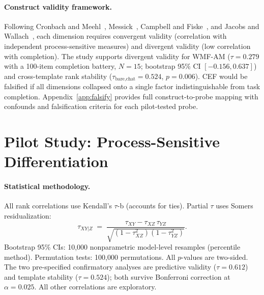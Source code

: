 \documentclass{article}
\begin{document}
\paragraph{Construct validity framework.}
Following Cronbach and Meehl~\citep{cronbach1955construct},
Messick~\citep{messick1989validity}, Campbell and
Fiske~\citep{campbell1959convergent}, and Jacobs and
Wallach~\citep{jacobs2021measurement}, each dimension requires convergent
validity (correlation with independent process-sensitive measures) and
divergent validity (low correlation with completion). The study supports
divergent validity for WMF-AM ($\tau = 0.279$ with a 100-item
completion battery, $N{=}15$; bootstrap 95\% CI $[-0.156, 0.637]$)
and cross-template rank stability ($\tau_{\text{bare,chat}} = 0.524$,
$p = 0.006$). CEF would
be falsified if all dimensions collapsed onto a single factor
indistinguishable from task completion.
Appendix~\ref{app:falsify} provides full construct-to-probe mapping
with confounds and falsification criteria for each pilot-tested probe.

\section{Pilot Study: Process-Sensitive Differentiation}
\label{sec:pilot}

\paragraph{Statistical methodology.}
All rank correlations use Kendall's $\tau$-b (accounts for ties).
Partial $\tau$ uses Somers residualization:
\[
  \tau_{XY|Z} \;=\; \frac{\tau_{XY} - \tau_{XZ}\,\tau_{YZ}}
  {\sqrt{(1-\tau_{XZ}^2)(1-\tau_{YZ}^2)}}.
\]
Bootstrap 95\% CIs: 10{,}000 nonparametric model-level resamples
(percentile method). Permutation tests: 100{,}000 permutations.
All $p$-values are two-sided. The two pre-specified confirmatory
analyses are predictive validity ($\tau = 0.612$) and template stability
($\tau = 0.524$); both survive Bonferroni correction at
$\alpha = 0.025$. All other correlations are exploratory.
\end{document}
